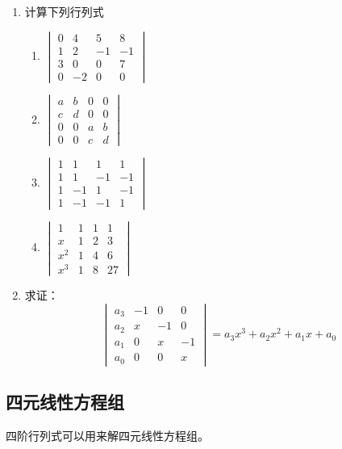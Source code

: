 \begin{ex}
\begin{enumerate}
    \item 计算下列行列式
\begin{multicols}{2}
\begin{enumerate}
    \item $\begin{vmatrix}
      0&4&5&8\\1&2&-1&-1\\
      3&0&0&7\\0&-2&0&0  
    \end{vmatrix}$
    \item $\begin{vmatrix}
        a&b&0&0\\c&d&0&0\\
        0&0&a&b\\0&0&c&d
    \end{vmatrix}$
    \item $\begin{vmatrix}
        1&1&1&1\\1&1&-1&-1\\
        1&-1&1&-1\\1&-1&-1&1
    \end{vmatrix}$
    \item $\begin{vmatrix}
        1&1&1&1\\x&1&2&3\\
        x^2&1&4&6\\x^3&1&8&27
    \end{vmatrix}$
\end{enumerate}
\end{multicols}
    \item 求证：
\[\begin{vmatrix}
    a_3&-1&0&0\\
    a_2&x&-1&0\\
    a_1&0&x&-1\\
    a_0&0&0&x
\end{vmatrix}=a_3x^3+a_2x^2+a_1x+a_0\]
\end{enumerate}    
\end{ex}
    
\subsection{四元线性方程组}
四阶行列式可以用来解四元线性方程组。

